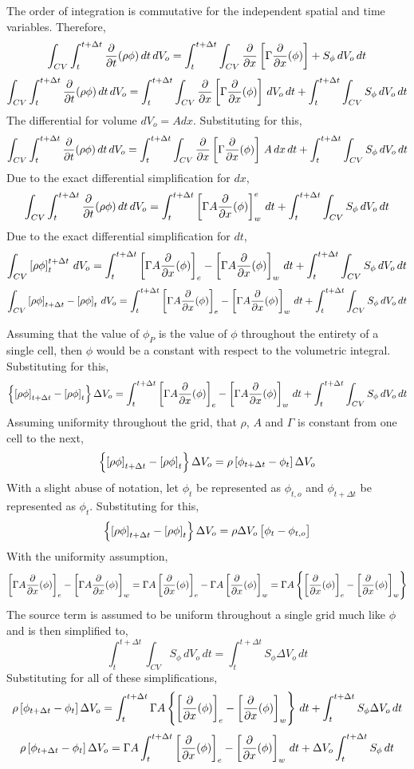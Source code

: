 \documentclass[class=report, 12pt, crop=false]{standalone}
\begin{document}
\begin{center}
The order of integration is commutative for the independent spatial and time variables. Therefore,
$$\int_{CV}\int^{t+\Delta t}_{t}\frac{\partial}{\partial t}(\rho \phi)\,dt\,dV_o = \int^{t+\Delta t}_{t}\int_{CV}\frac{\partial}{\partial x}\left[\Gamma \frac{\partial}{\partial x}(\phi)\right] + S_\phi\,dV_o\,dt$$
$$\int_{CV}\int^{t+\Delta t}_{t}\frac{\partial}{\partial t}(\rho \phi)\,dt\,dV_o = \int^{t+\Delta t}_{t}\int_{CV}\frac{\partial}{\partial x}\left[\Gamma \frac{\partial}{\partial x}(\phi)\right]\,dV_o\,dt + \int^{t+\Delta t}_{t}\int_{CV}S_\phi\,dV_o\,dt$$
The differential for volume $dV_o = A dx$. Substituting for this,
$$\int_{CV}\int^{t+\Delta t}_{t}\frac{\partial}{\partial t}(\rho \phi)\,dt\,dV_o = \int^{t+\Delta t}_{t}\int_{CV}\frac{\partial}{\partial x}\left[\Gamma \frac{\partial}{\partial x}(\phi)\right]\,A\,dx\,dt + \int^{t+\Delta t}_{t}\int_{CV}S_\phi\,dV_o\,dt$$
Due to the exact differential simplification for $dx$,
$$\int_{CV}\int^{t+\Delta t}_{t}\frac{\partial}{\partial t}(\rho \phi)\,dt\,dV_o = \int^{t+\Delta t}_{t}\left[\Gamma A\frac{\partial}{\partial x}(\phi)\right]^{e}_{w}\,dt + \int^{t+\Delta t}_{t}\int_{CV}S_\phi\,dV_o\,dt$$
Due to the exact differential simplification for $dt$,
$$\int_{CV}\left[\rho \phi\right]^{t+\Delta t}_{t}\,dV_o = \int^{t+\Delta t}_{t}\left[\Gamma A\frac{\partial}{\partial x}(\phi)\right]_{e} - \left[\Gamma A\frac{\partial}{\partial x}(\phi)\right]_{w}\,dt + \int^{t+\Delta t}_{t}\int_{CV}S_\phi\,dV_o\,dt$$
$$\int_{CV}\left[\rho \phi\right]_{t+\Delta t} - \left[\rho \phi\right]_{t}\,dV_o = \int^{t+\Delta t}_{t}\left[\Gamma A\frac{\partial}{\partial x}(\phi)\right]_{e} - \left[\Gamma A\frac{\partial}{\partial x}(\phi)\right]_{w}\,dt + \int^{t+\Delta t}_{t}\int_{CV}S_\phi\,dV_o\,dt$$

Assuming that the value of $\phi_P$ is the value of $\phi$ throughout the entirety of a single cell, then $\phi$ would be a constant with respect to the volumetric integral. Substituting for this,
$$\left\{\left[\rho \phi\right]_{t+\Delta t} - \left[\rho \phi\right]_{t}\right\}\Delta V_o = \int^{t+\Delta t}_{t}\left[\Gamma A\frac{\partial}{\partial x}(\phi)\right]_{e} - \left[\Gamma A\frac{\partial}{\partial x}(\phi)\right]_{w}\,dt + \int^{t+\Delta t}_{t}\int_{CV}S_\phi\,dV_o\,dt$$
Assuming uniformity throughout the grid, that $\rho$, $A$ and $\Gamma$ is constant from one cell to the next,
$$\left\{\left[\rho \phi\right]_{t+\Delta t} - \left[\rho \phi\right]_{t}\right\}\Delta V_o = \rho \left[\phi_{t+\Delta t} - \phi_{t}\right]\Delta V_o$$
With a slight abuse of notation, let $\phi_{t}$ be represented as $\phi_{t,o}$ and $\phi_{t+\Delta t}$ be represented as $\phi_{t}$. Substituting for this,
$$\left\{\left[\rho \phi\right]_{t+\Delta t} - \left[\rho \phi\right]_{t}\right\}\Delta V_o = \rho\Delta V_o \left[\phi_{t} - \phi_{t,o}\right]$$
With the uniformity assumption,
$$\left[\Gamma A\frac{\partial}{\partial x}(\phi)\right]_{e} - \left[\Gamma A\frac{\partial}{\partial x}(\phi)\right]_{w} = \Gamma A\left[\frac{\partial}{\partial x}(\phi)\right]_{e} - \Gamma A\left[\frac{\partial}{\partial x}(\phi)\right]_{w} = \Gamma A\left\{\left[\frac{\partial}{\partial x}(\phi)\right]_{e} - \left[\frac{\partial}{\partial x}(\phi)\right]_{w}\right\}$$
The source term is assumed to be uniform throughout a single grid much like $\phi$ and is then simplified to,
$$\int^{t+\Delta t}_{t}\int_{CV}S_\phi\,dV_o\,dt = \int^{t+\Delta t}_{t} S_\phi\Delta V_o\,dt$$
Substituting for all of these simplifications,
$$\rho \left[\phi_{t+\Delta t} - \phi_{t}\right]\Delta V_o = \int^{t+\Delta t}_{t}\Gamma A\left\{\left[\frac{\partial}{\partial x}(\phi)\right]_{e} - \left[\frac{\partial}{\partial x}(\phi)\right]_{w}\right\}\,dt + \int^{t+\Delta t}_{t} S_\phi\Delta V_o\,dt$$
$$\rho \left[\phi_{t+\Delta t} - \phi_{t}\right]\Delta V_o = \Gamma A\int^{t+\Delta t}_{t}\left[\frac{\partial}{\partial x}(\phi)\right]_{e} - \left[\frac{\partial}{\partial x}(\phi)\right]_{w}\,dt + \Delta V_o\int^{t+\Delta t}_{t} S_\phi\,dt$$

\end{center}
\end{document}
